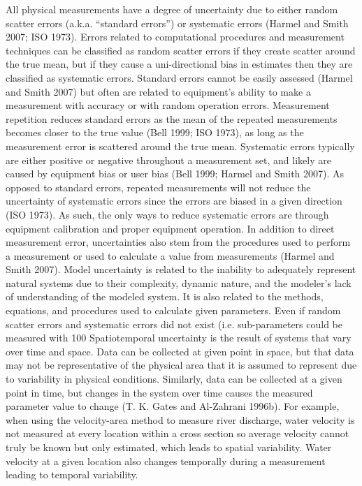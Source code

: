 \begin{linenumbers}
All physical measurements have a degree of uncertainty due to either random scatter errors (a.k.a. “standard errors”) or systematic errors (Harmel and Smith 2007; ISO 1973).  Errors related to computational procedures and measurement techniques can be classified as random scatter errors if they create scatter around the true mean, but if they cause a uni-directional bias in estimates then they are classified as systematic errors.
Standard errors cannot be easily assessed (Harmel and Smith 2007) but often are related to equipment’s ability to make a measurement with accuracy or with random operation errors.  Measurement repetition reduces standard errors as the mean of the repeated measurements becomes closer to the true value (Bell 1999; ISO 1973), as long as the measurement error is scattered around the true mean.
Systematic errors typically are either positive or negative throughout a measurement set, and likely are caused by equipment bias or user bias (Bell 1999; Harmel and Smith 2007).  As opposed to standard errors, repeated measurements will not reduce the uncertainty of systematic errors since the errors are biased in a given direction (ISO 1973).  As such, the only ways to reduce systematic errors are through equipment calibration and proper equipment operation.
In addition to direct measurement error, uncertainties also stem from the procedures used to perform a measurement or used to calculate a value from measurements (Harmel and Smith 2007).  Model uncertainty is related to the inability to adequately represent natural systems due to their complexity, dynamic nature, and the modeler's lack of understanding of the modeled system.  It is also related to the methods, equations, and procedures used to calculate given parameters.  Even if random scatter errors and systematic errors did not exist (i.e. sub-parameters could be measured with 100%
Spatiotemporal uncertainty is the result of systems that vary over time and space.  Data can be collected at given point in space, but that data may not be representative of the physical area that it is assumed to represent due to variability in physical conditions.  Similarly, data can be collected at a given point in time, but changes in the system over time causes the measured parameter value to change (T. K. Gates and Al-Zahrani 1996b).  For example, when using the velocity-area method to measure river discharge, water velocity is not measured at every location within a cross section so average velocity cannot truly be known but only estimated, which leads to spatial variability.  Water velocity at a given location also changes temporally during a measurement leading to temporal variability.

\end{linenumbers}
